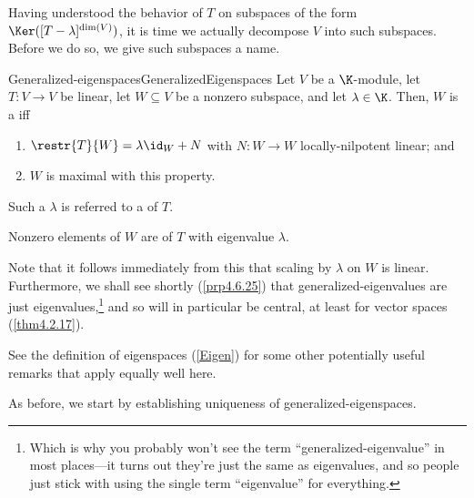 Having understood the behavior of $T$ on subspaces of the form $\Ker ([T-\lambda ]^{\dim (V)})$, it is time we actually decompose $V$ into such subspaces.  Before we do so, we give such subspaces a name.
\begin{dfn}{Generalized-eigenspaces}{GeneralizedEigenspaces}
	Let $V$ be a $\K$-module, let $T\colon V\rightarrow V$ be linear, let $W\subseteq V$ be a nonzero subspace, and let $\lambda \in \K$.  Then, $W$ is a  iff
	\begin{enumerate}
		\item $\restr{T}{W}=\lambda \id _W+N$ with $N\colon W\rightarrow W$ locally-nilpotent linear; and
		\item $W$ is maximal with this property.
	\end{enumerate}
	\begin{rmk}
		Such a $\lambda$ is referred to a  of $T$.
	\end{rmk}
	\begin{rmk}
		Nonzero elements of $W$ are  of $T$ with eigenvalue $\lambda$.
	\end{rmk}
	\begin{rmk}
		Note that it follows immediately from this that scaling by $\lambda$ on $W$ is linear.  Furthermore, we shall see shortly (\cref{prp4.6.25}) that generalized-eigenvalues are just eigenvalues,\footnote{Which is why you probably won't see the term ``generalized-eigenvalue'' in most places---it turns out they're just the same as eigenvalues, and so people just stick with using the single term ``eigenvalue'' for everything.} and so will in particular be central, at least for vector spaces (\cref{thm4.2.17}).
	\end{rmk}
	\begin{rmk}
		See the definition of eigenspaces (\cref{Eigen}) for some other potentially useful remarks that apply equally well here.
	\end{rmk}
\end{dfn}
As before, we start by establishing uniqueness of generalized-eigenspaces.

